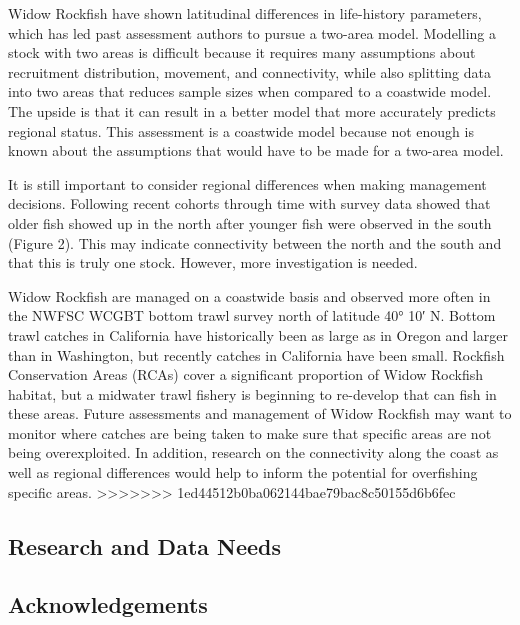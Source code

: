 \documentclass[
]{scrartcl}
\begin{document}
Widow Rockfish have shown latitudinal differences in life-history
parameters, which has led past assessment authors to pursue a two-area
model. Modelling a stock with two areas is difficult because it requires
many assumptions about recruitment distribution, movement, and
connectivity, while also splitting data into two areas that reduces
sample sizes when compared to a coastwide model. The upside is that it
can result in a better model that more accurately predicts regional
status. This assessment is a coastwide model because not enough is known
about the assumptions that would have to be made for a two-area model.

It is still important to consider regional differences when making
management decisions. Following recent cohorts through time with survey
data showed that older fish showed up in the north after younger fish
were observed in the south (Figure 2). This may indicate connectivity
between the north and the south and that this is truly one stock.
However, more investigation is needed.

Widow Rockfish are managed on a coastwide basis and observed more often
in the NWFSC WCGBT bottom trawl survey north of latitude 40° 10′ N.
Bottom trawl catches in California have historically been as large as in
Oregon and larger than in Washington, but recently catches in California
have been small. Rockfish Conservation Areas (RCAs) cover a significant
proportion of Widow Rockfish habitat, but a midwater trawl fishery is
beginning to re-develop that can fish in these areas. Future assessments
and management of Widow Rockfish may want to monitor where catches are
being taken to make sure that specific areas are not being
overexploited. In addition, research on the connectivity along the coast
as well as regional differences would help to inform the potential for
overfishing specific areas.
\textgreater\textgreater\textgreater\textgreater\textgreater\textgreater\textgreater{}
1ed44512b0ba062144bae79bac8c50155d6b6fec

\subsection{Research and Data Needs}\label{research-and-data-needs-1}

\newpage{}

\subsection{Acknowledgements}\label{sec-acknowledgements}
\end{document}
